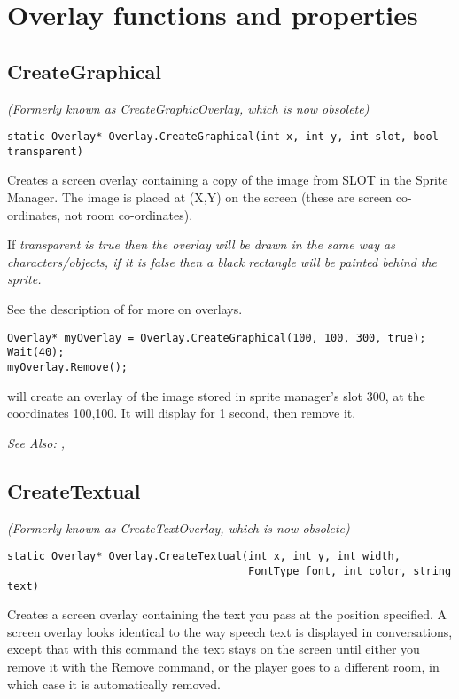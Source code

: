 \section{Overlay functions and properties}%


\subsection{CreateGraphical}\label{Overlay.CreateGraphical}%

\it{(Formerly known as CreateGraphicOverlay, which is now obsolete)}

\begin{verbatim}
static Overlay* Overlay.CreateGraphical(int x, int y, int slot, bool transparent)
\end{verbatim}
Creates a screen overlay containing a copy of the image from SLOT in
the Sprite Manager. The image is placed at (X,Y) on the screen (these are
screen co-ordinates, not room co-ordinates).

If \it{transparent} is true then the overlay will be drawn in the
same way as characters/objects, if it is false
then a black rectangle will be painted behind the sprite.

See the description of  for more on overlays.

\begin{verbatim}
Overlay* myOverlay = Overlay.CreateGraphical(100, 100, 300, true);
Wait(40);
myOverlay.Remove();
\end{verbatim}
will create an overlay of the image stored in sprite manager's slot 300, at the
coordinates 100,100. It will display for 1 second, then remove it.

\it{See Also:} ,


\subsection{CreateTextual}\label{Overlay.CreateTextual}%

\it{(Formerly known as CreateTextOverlay, which is now obsolete)}

\begin{verbatim}
static Overlay* Overlay.CreateTextual(int x, int y, int width,
                                      FontType font, int color, string text)
\end{verbatim}
Creates a screen overlay containing the text you pass at the position
specified. A screen overlay looks identical to the way speech text is
displayed in conversations, except that with this command the text stays
on the screen until either you remove it with the Remove command, or the player
goes to a different room, in which case it is automatically removed.

